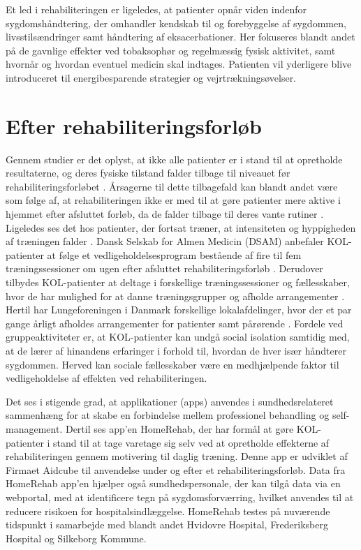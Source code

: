 Et led i rehabiliteringen er ligeledes, at patienter opnår viden indenfor sygdomshåndtering, der omhandler kendskab til og forebyggelse af sygdommen, livsstilsændringer samt håndtering af eksacerbationer.\cite{McCarthy2015,Sundhedsstyrelsen2015} Her fokuseres blandt andet på de gavnlige effekter ved tobaksophør og regelmæssig fysisk aktivitet, samt hvornår og hvordan eventuel medicin skal indtages. Patienten vil yderligere blive introduceret til energibesparende strategier og vejrtrækningsøvelser.\cite{McCarthy2015,Sundhedsstyrelsen2015}    

\section{Efter rehabiliteringsforløb}
Gennem studier er det oplyst, at ikke alle patienter er i stand til at opretholde resultaterne, og deres fysiske tilstand falder tilbage til niveauet før rehabiliteringsforløbet \cite{Egan2012,Beachamp2013,Zanaboni2017,Ringbaek2008}. 
Årsagerne til dette tilbagefald kan blandt andet være som følge af, at rehabiliteringen ikke er med til at gøre patienter mere aktive i hjemmet efter afsluttet forløb, da de falder tilbage til deres vante rutiner \cite{Egan2012}. Ligeledes ses det hos patienter, der fortsat træner, at intensiteten og hyppigheden af træningen falder \cite{Ringbaek2008}. 
Dansk Selskab for Almen Medicin (DSAM) anbefaler KOL-patienter
at følge et vedligeholdelsesprogram bestående af fire til fem træningssessioner om ugen
efter afsluttet rehabiliteringsforløb \cite{dsam2016}. Derudover tilbydes KOL-patienter at deltage i forskellige træningssessioner og fællesskaber, hvor de har mulighed for at danne træningsgrupper og afholde arrangementer \cite{Sundhedsstyrelsen2015}. Hertil har Lungeforeningen i Danmark forskellige lokalafdelinger, hvor der et par gange årligt afholdes arrangementer for patienter samt pårørende \cite{Lungeforeningen2016}.
Fordele ved gruppeaktiviteter er, at KOL-patienter kan undgå social isolation samtidig med, at de lærer af hinandens erfaringer i forhold til, hvordan de hver især håndterer sygdommen. Herved kan sociale fællesskaber være en medhjælpende faktor til vedligeholdelse af effekten ved rehabiliteringen.\cite{dsam2016}

Det ses i stigende grad, at applikationer (apps) anvendes i sundhedsrelateret sammenhæng for at skabe en forbindelse mellem professionel behandling og self-management. Dertil ses app'en HomeRehab, der har  formål at gøre KOL-patienter i stand til at tage varetage sig selv ved at opretholde effekterne af rehabiliteringen gennem motivering til daglig træning. Denne app er udviklet af Firmaet Aidcube til anvendelse under og efter et rehabiliteringsforløb. Data fra HomeRehab app'en hjælper også sundhedspersonale, der kan tilgå data via en webportal, med at identificere tegn på sygdomsforværring, hvilket anvendes til at reducere risikoen for hospitalsindlæggelse. HomeRehab testes på nuværende tidspunkt i samarbejde med blandt andet Hvidovre Hospital, Frederiksberg Hospital og Silkeborg Kommune.\cite{HealthcareDenmark2017} 

